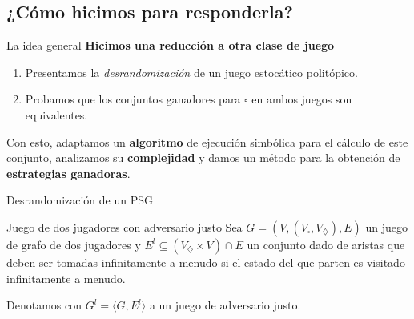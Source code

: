 \documentclass{beamer}
\newcommand{\diam}{\diamondsuit}
\newcommand{\cuad}{\square}
\begin{document}
\subsection{¿C\'omo hicimos para responderla?}

\begin{frame}{La idea general}
	\textbf{Hicimos una reducci\'on a otra clase de juego}
	\pause
	\begin{enumerate}
		\item Presentamos la \textit{desrandomizaci\'on} de un juego estoc\'atico
		      polit\'opico. \pause
		\item Probamos que los conjuntos ganadores para $\cuad$ en ambos juegos son
		      equivalentes. \pause
	\end{enumerate}
	Con esto, adaptamos un \textbf{algoritmo} de ejecuci\'on simb\'olica para el c\'alculo de este conjunto, analizamos su \textbf{complejidad} y damos un m\'etodo para la obtenci\'on de \textbf{estrategias ganadoras}.
\end{frame}

\begin{frame}{Desrandomizaci\'on de un PSG}
	\pause
	\begin{block}{Juego de dos jugadores con adversario justo}
		Sea $G = (V, (V_\cuad, V_\diam), E)$ un juego de grafo de dos jugadores y
		$E^{l} \subseteq (V_\diam \times V) \cap E$ un conjunto dado de aristas que
		deben ser tomadas infinitamente a menudo si el estado del que parten es
		visitado infinitamente a menudo.

		Denotamos con $G^{l} = \langle G, E^{l} \rangle$ a un juego de adversario
		justo.
	\end{block}


\end{frame}
\end{document}
